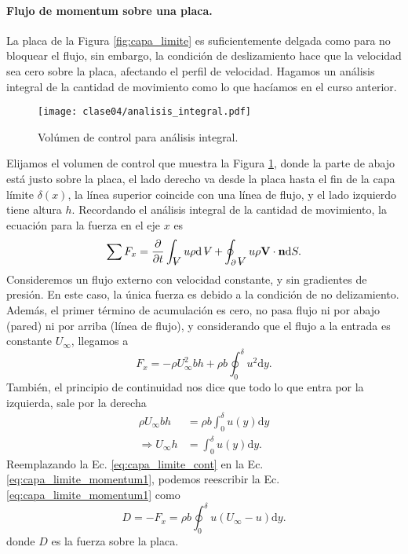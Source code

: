 \paragraph*{Flujo de momentum sobre una placa.}
La placa de la Figura \ref{fig:capa_limite} es suficientemente delgada como para no bloquear el flujo, sin embargo, la condición de deslizamiento hace que la velocidad sea cero sobre la placa, afectando el perfil de velocidad.
Hagamos un análisis integral de la cantidad de movimiento como lo que hacíamos en el curso anterior.
%
\begin{figure}[!h]
\centering
\texttt{[image: clase04/analisis\_integral.pdf]}
\caption{Volúmen de control para análisis integral.}
\label{fig:analisis_integral}
\end{figure}
%
Elijamos el volumen de control que muestra la Figura \ref{fig:analisis_integral}, donde la parte de abajo está justo sobre la placa, el lado derecho va desde la placa hasta el fin de la capa límite $\delta(x)$, la línea superior coincide con una línea de flujo, y el lado izquierdo tiene altura $h$.
Recordando el análisis integral de la cantidad de movimiento, la ecuación para la fuerza en el eje $x$ es
%
\begin{equation}
\sum F_x = \frac{\partial}{\partial t} \int_{\vol} u\rho \mathrm{d}\vol + \oint_{\partial\vol} u\rho\mathbf{V}\cdot\mathbf{n}\mathrm{d}S.
\end{equation}
%
Consideremos un flujo externo con velocidad constante, y sin gradientes de presión. En este caso, la única fuerza es debido a la condición de no delizamiento. Además, el primer término de acumulación es cero, no pasa flujo ni por abajo (pared) ni por arriba (línea de flujo), y considerando que el flujo a la entrada es constante $U_\infty$, llegamos a
%
\begin{equation}\label{eq:capa_limite_momentum1}
F_x = -\rho U_\infty^2 bh + \rho b \oint_0^\delta u^2\mathrm{d}y.
\end{equation}
%
También, el principio de continuidad nos dice que todo lo que entra por la izquierda, sale por la derecha
%
\begin{align}\label{eq:capa_limite_cont}
\rho U_\infty bh &= \rho b \int_0^\delta u(y)\mathrm{d}y \nonumber\\
\Rightarrow U_\infty h &= \int_0^\delta u(y)\mathrm{d}y.
\end{align}
%
Reemplazando la Ec. \eqref{eq:capa_limite_cont} en la Ec. \eqref{eq:capa_limite_momentum1}, podemos reescribir la Ec. \eqref{eq:capa_limite_momentum1} como
%
\begin{equation}\label{eq:capa_limite_momentum}
D = -F_x = \rho b \oint_0^\delta u(U_\infty - u)\mathrm{d}y.
\end{equation}
%
donde $D$ es la fuerza sobre la placa.


